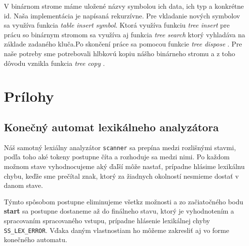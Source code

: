 \documentclass[12pt, a4paper]{article}
\begin{document}
				V binárnom strome máme uložené názvy symbolou ich data, ich typ a konkrétne id. Naša implementácia je napísaná rekurzívne. Pre vkladanie nových symbolov sa využíva funkcia \textit{table insert symbol}. Ktorá využíva funkciu \textit{tree insert} pre prácu so binárnym stromom sa využíva aj funkcia \textit{tree search} ktorý vyhladáva na základe zadaného kluča.Po skončení práce sa pomocou funkcie \textit{tree dispose} . Pre naše potreby sme potrebovali hlbkovú kopiu nášho binárneho stromu a z toho dôvodu vznikla funkcia \textit{tree copy} .
    \newpage
	\section{Prílohy}
        \subsection{Konečný automat lexikálneho analyzátora} \label{sec:KA}
        Náš samotný lexiálny analyzátor \texttt{scanner} sa prepína medzi rozlišnými stavmi, podľa toho aké tokeny postupne číta a rozhoduje sa medzi nimi. Po každom možnom stave vyhodnocujeme aký ďaľší môže nastať, prípadne hlásime lexikálnu chybu, keďže sme prečítal znak, ktorý za žiadnych okolností nesmieme dostať v danom stave.

        Týmto spôsobom postupne eliminujeme všetkz možnosti a zo začiatočného bodu \textbf{start} sa postupne dostaneme až do finálneho stavu, ktorý je vyhodnotením a spracovaním spracovaného vstupu, prípadne hlásenie lexikálnej chyby \verb|SS_LEX_ERROR|. Vďaka daným vlastnostiam ho môžeme zakresliť aj vo forme konečného automatu.
\end{document}
